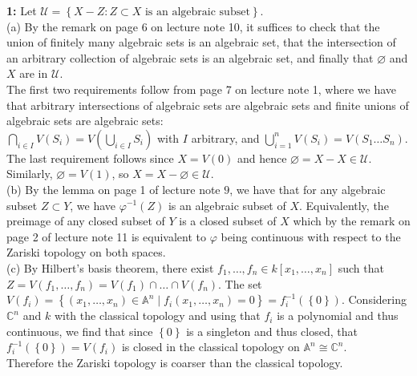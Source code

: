 \documentclass[a4paper]{article}
\begin{document}
\textbf{1:} Let $\mathcal{U} = \left\{ X - Z  \colon Z \subset X \text{ is an
algebraic subset} \right\} $.\\
    (a) By the remark on page 6 on lecture note 10, it suffices to check that
    the union of finitely many algebraic sets is an algebraic set, that
    the intersection of an arbitrary collection of algebraic sets is an
    algebraic set, and finally that $\varnothing$ and $X$ are
    in $\mathcal{U}$.\\
    The first two requirements follow from page 7 on lecture note 1, where we
    have that arbitrary intersections of algebraic sets are algebraic sets and
    finite unions of algebraic sets are algebraic sets:\\
    $\bigcap_{i \in  I} V(S_i) = V \left( \bigcup_{i \in  I} S_i \right) $ with
    $I$ arbitrary, and
    $\bigcup_{i =1}^{n} V(S_i) = V\left( S_1 \ldots S_n \right) $.\\
    The last requirement follows since $X = V(0)$ and hence
    $\varnothing = X - X \in \mathcal{U}$. Similarly, 
    $\varnothing = V(1)$, so $X = X - \varnothing \in \mathcal{U}$.\\
    \linebreak
    (b) By the lemma on page 1 of lecture note $9$, we have
    that for any algebraic subset $Z \subset Y$, we have
    $\varphi^{-1}(Z)$ is an algebraic subset of $X$. Equivalently, the
    preimage of any closed subset of $Y$ is a closed subset of $X$ which by the
    remark on page 2 of lecture note 11 is equivalent to $\varphi$ being
    continuous with respect to the Zariski topology on both spaces.\\
    \linebreak
    (c) By Hilbert's basis theorem, there exist $f_1, \ldots, f_n
    \in k\left[ x_1, \ldots, x_n \right] $ such that
    $Z = V\left( f_1, \ldots, f_n \right) = V(f_1)
    \cap \ldots \cap V(f_n)$. The set
    $V(f_i) = \left\{ (x_1, \ldots, x_n) \in \mathbb{A}^{n}  \mid 
    f_i \left( x_1, \ldots, x_n \right) = 0\right\} 
    = f_i^{-1}\left( \left\{ 0 \right\}  \right) $. Considering
    $\mathbb{C}^{n}$ and $k$ with the classical topology and using that
    $f_i$ is a polynomial and thus continuous, we find that since
    $\left\{ 0 \right\} $ is a singleton and thus closed, that
    $f_i^{-1}(\left\{ 0 \right\} )  = V\left( f_i \right) $ is closed in the
    classical topology on $\mathbb{A}^{n} \cong \mathbb{C}^{n}$.\\
    Therefore the Zariski topology is coarser than the classical topology.\\
\end{document}
